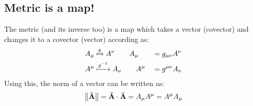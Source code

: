\subsection{Metric is a map!}
The metric (and its inverse too) is a map which takes a vector (covector) and changes it to a covector (vector) according as:
\begin{alignat*}{3}
    A_\mu & \xmapsto{g} A^\nu \qquad A_\mu &&= g_{\mu\nu} A^\nu \\
     A^\mu & \xmapsto{g^{-1}} A_\nu \qquad A^\mu &&= g^{\mu\nu} A_\nu \\
\end{alignat*}
Using this, the norm of a vector can be written as:
$$\norm{\vb{\bar{A}}} = \vb{\bar{A}}\cdot \vb{\bar{A}} = A_\mu A^\mu = A^\mu A_\mu$$
 